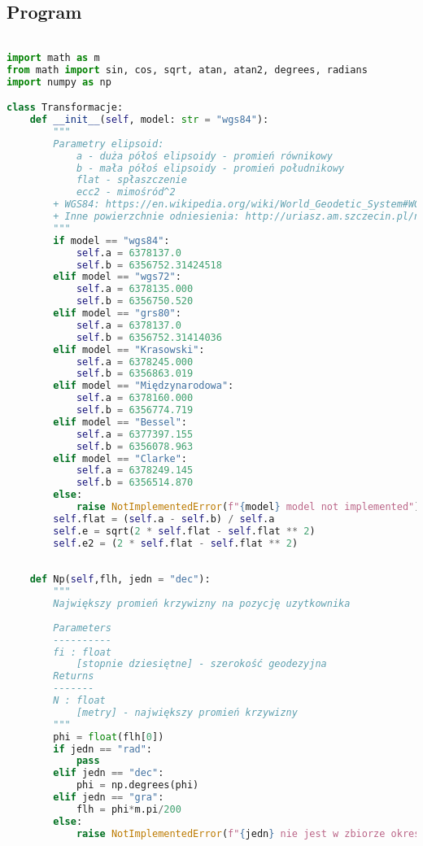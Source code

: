 \newpage
\subsection{Program}

\begin{lstlisting}[caption={\emph{Treść programu}}, language=Python]

import math as m
from math import sin, cos, sqrt, atan, atan2, degrees, radians
import numpy as np

class Transformacje:
    def __init__(self, model: str = "wgs84"):
        """
        Parametry elipsoid:
            a - duża półoś elipsoidy - promień równikowy
            b - mała półoś elipsoidy - promień południkowy
            flat - spłaszczenie
            ecc2 - mimośród^2
        + WGS84: https://en.wikipedia.org/wiki/World_Geodetic_System#WGS84
        + Inne powierzchnie odniesienia: http://uriasz.am.szczecin.pl/naw_bezp/elipsoida.html
        """
        if model == "wgs84":
            self.a = 6378137.0 
            self.b = 6356752.31424518 
        elif model == "wgs72":
            self.a = 6378135.000
            self.b = 6356750.520
        elif model == "grs80":
            self.a = 6378137.0
            self.b = 6356752.31414036
        elif model == "Krasowski":
            self.a = 6378245.000
            self.b = 6356863.019
        elif model == "Międzynarodowa":
            self.a = 6378160.000
            self.b = 6356774.719
        elif model == "Bessel":
            self.a = 6377397.155
            self.b = 6356078.963
        elif model == "Clarke":
            self.a = 6378249.145
            self.b = 6356514.870
        else:
            raise NotImplementedError(f"{model} model not implemented")
        self.flat = (self.a - self.b) / self.a
        self.e = sqrt(2 * self.flat - self.flat ** 2) 
        self.e2 = (2 * self.flat - self.flat ** 2) 
        
        
    def Np(self,flh, jedn = "dec"):
        """
        Największy promień krzywizny na pozycję uzytkownika
        
        Parameters
        ----------
        fi : float
            [stopnie dziesiętne] - szerokość geodezyjna
        Returns
        -------
        N : float
            [metry] - największy promień krzywizny
        """
        phi = float(flh[0])
        if jedn == "rad":
            pass
        elif jedn == "dec":
            phi = np.degrees(phi)
        elif jedn == "gra":
            flh = phi*m.pi/200
        else:
            raise NotImplementedError(f"{jedn} nie jest w zbiorze okreslen")
            

\end{lstlisting}
